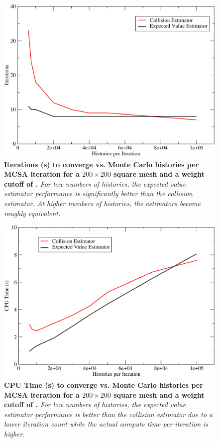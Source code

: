\begin{figure}[t!]
  \centering
  \includegraphics[width=5in,clip]{chapters/mc_background/estimator_nh_iters.pdf}
  \caption{\textbf{Iterations (s) to converge vs. Monte Carlo
      histories per MCSA iteration for a $200 \times 200$ square mesh
      and a weight cutoff of .} \textit{For low numbers of
      histories, the expected value estimator performance is
      significantly better than the collision estimator. At higher
      numbers of histories, the estimators become roughly
      equivalent.}}
  \label{fig:estimator_nh_iters}
\end{figure}

\begin{figure}[t!]
  \centering
  \includegraphics[width=5in,clip]{chapters/mc_background/estimator_nh_time.pdf}
  \caption{\textbf{CPU Time (s) to converge vs. Monte Carlo histories
      per MCSA iteration for a $200 \times 200$ square mesh and a
      weight cutoff of .} \textit{For low numbers of
      histories, the expected value estimator performance is better
      than the collision estimator due to a lower iteration count
      while the actual compute time per iteration is higher.}}
  \label{fig:estimator_nh_time}
\end{figure}

